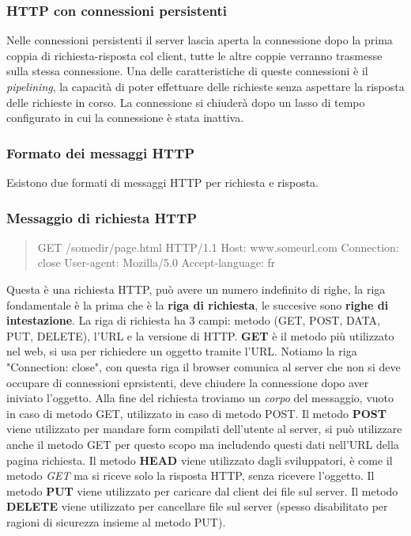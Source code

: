 \subsubsection*{HTTP con connessioni persistenti}
Nelle connessioni persistenti il server lascia aperta la connessione dopo la prima coppia di richiesta-risposta col client, tutte le altre coppie verranno trasmesse sulla stessa connessione.
Una delle caratteristiche di queste connessioni è il \textit{pipelining}, la capacità di poter effettuare delle richieste senza aspettare la risposta delle richieste in corso.
La connessione si chiuderà dopo un lasso di tempo configurato in cui la connessione è stata inattiva.

\subsubsection{Formato dei messaggi HTTP}
Esistono due formati di messaggi HTTP per richiesta e risposta.

\subsubsection*{Messaggio di richiesta HTTP}
\begin{quote}
  GET /somedir/page.html HTTP/1.1 \newline
  Host: www.someurl.com \newline
  Connection: close \newline
  User-agent: Mozilla/5.0 \newline
  Accept-language: fr
\end{quote}

Questa è una richiesta HTTP, può avere un numero indefinito di righe, la riga fondamentale è la prima che è la \textbf{riga di richiesta}, le succesive sono \textbf{righe di intestazione}.
La riga di richiesta ha 3 campi: metodo (GET, POST, DATA, PUT, DELETE), l'URL e la versione di HTTP. \newline
\textbf{GET} è il metodo più utilizzato nel web, si usa per richiedere un oggetto tramite l'URL.
Notiamo la riga "Connection: close", con questa riga il browser comunica al server che non si deve occupare di connessioni eprsistenti, deve chiudere la connessione dopo aver iniviato l'oggetto.\newline
Alla fine del richiesta troviamo un \textit{corpo} del messaggio, vuoto in caso di metodo GET, utilizzato in caso di metodo POST. \newline
Il metodo \textbf{POST} viene utilizzato per mandare form compilati dell'utente al server, si può utilizzare anche il metodo GET per questo scopo ma includendo questi dati nell'URL della pagina richiesta. \newline
Il metodo \textbf{HEAD} viene utilizzato dagli sviluppatori, è come il metodo \textit{GET} ma si riceve solo la risposta HTTP, senza ricevere l'oggetto. \newline
Il metodo \textbf{PUT} viene utilizzato per caricare dal client dei file sul server. \newline
Il metodo \textbf{DELETE} viene utilizzato per cancellare file sul server (spesso disabilitato per ragioni di sicurezza insieme al metodo PUT). \newline

